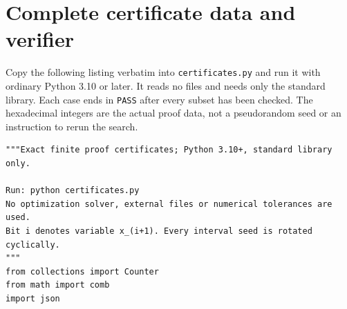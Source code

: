 \documentclass[11pt,a4paper]{article}
\begin{document}
\section{Complete certificate data and verifier}\label{app:code}
Copy the following listing verbatim into \texttt{certificates.py} and run
it with ordinary Python 3.10 or later. It reads no files and needs only
the standard library. Each case ends in \texttt{PASS} after every subset
has been checked. The hexadecimal integers are the actual proof data,
not a pseudorandom seed or an instruction to rerun the search.
\begin{lstlisting}
"""Exact finite proof certificates; Python 3.10+, standard library only.

Run: python certificates.py
No optimization solver, external files or numerical tolerances are used.
Bit i denotes variable x_(i+1). Every interval seed is rotated cyclically.
"""
from collections import Counter
from math import comb
import json


\end{lstlisting}
\end{document}
